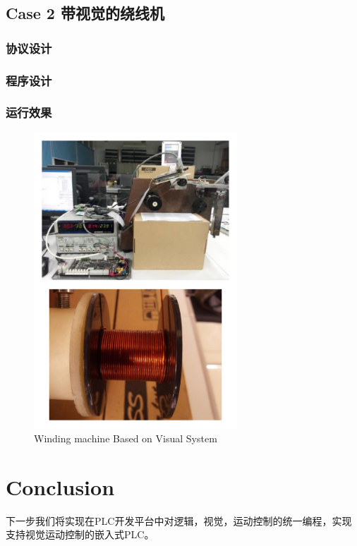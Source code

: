 \documentclass[journal,UTF8]{IEEEtran}
\begin{document}
\subsection{Case 2 带视觉的绕线机}

\subsubsection{协议设计}

\subsubsection{程序设计}

\subsubsection{运行效果}
\begin{figure}
	\centering
	\includegraphics[width=3in]{fig/Winding.pdf}
	\caption{ Winding machine Based on Visual System}
	\label{fig:Winding}
\end{figure}
\section{Conclusion}
\label{conclusion}

下一步我们将实现在PLC开发平台中对逻辑，视觉，运动控制的统一编程，实现支持视觉运动控制的嵌入式PLC。

\ifCLASSOPTIONcaptionsoff
  \newpage
\fi
\end{document}
